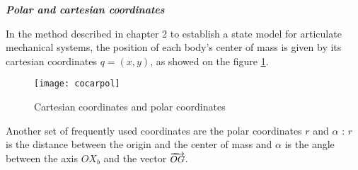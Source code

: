 \begin{exemple}{\bf \em Polar and cartesian coordinates}

In the method described in chapter 2 to establish a state model for articulate mechanical systems, the position of each body's center of mass is given by its cartesian coordinates $q =(x,y)$, as showed on the figure \ref{Fig:cocarpol}.
\begin{figure}[htbp] 
   \centering
   \texttt{[image: cocarpol]} 
   \caption{Cartesian coordinates and polar coordinates}
   \label{Fig:cocarpol}
\end{figure}
Another set of frequently used coordinates are the polar coordinates $r$ and $\alpha$ : $r$ is the distance between the origin and the center of mass and $\alpha$ is the angle between the axis $OX_b$ and the vector $\small \overrightarrow{OG}$.


\end{exemple}
